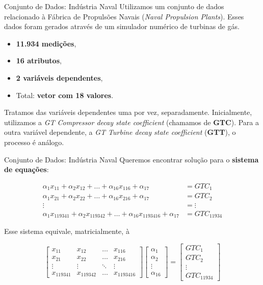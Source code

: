 \documentclass{beamer}
\theoremstyle{definition}
\begin{document}
\begin{frame}{Conjunto de Dados: Indústria Naval}
\justifying
Utilizamos um conjunto de dados relacionado à Fábrica de Propulsões Navais (\textit{Naval Propulsion Plants}). Esses dados foram gerados através de um simulador numérico de turbinas de gás.

\begin{itemize}
    \item \textbf{11.934 medições},
    \item \textbf{16 atributos},
    \item \textbf{2 variáveis dependentes},
    \item Total: \textbf{vetor com 18 valores}.
\end{itemize}
\pause
    
 Tratamos das variáveis dependentes uma por vez, separadamente. Inicialmente, utilizamos a \textit{GT Compressor decay state coefficient} (chamamos de \textbf{GTC}). Para a outra variável dependente, a \textit{GT Turbine decay state coefficient} (\textbf{GTT}), o processo é análogo.
   
\end{frame}

\begin{frame}{Conjunto de Dados: Indústria Naval}
\justifying
Queremos encontrar solução para o \textbf{sistema de equações}:
    
\begin{align*}
    \alpha_1 x_{11} + \alpha_2 x_{12} + \ldots + \alpha_{16} x_{116} + \alpha_{17} &= GTC_1\\
    \alpha_1 x_{21} + \alpha_2 x_{22} + \ldots + \alpha_{16} x_{216} + \alpha_{17} &= GTC_2\\
    \vdots &= \vdots\\
    \alpha_1 x_{119341} + \alpha_2 x_{119342} + \ldots + \alpha_{16} x_{1193416} + \alpha_{17} &= GTC_{11934}
\end{align*}
\pause

Esse sistema equivale, matricialmente, à

$$
\begin{bmatrix}
    x_{11} & x_{12} & \dots & x_{116} \\
    x_{21} & x_{22} & \dots & x_{216} \\
    \vdots & \vdots & \ddots & \vdots \\
    x_{119341} & x_{119342} & \dots & x_{1193416}
\end{bmatrix}
\begin{bmatrix}
    \alpha_1 \\
    \alpha_2 \\
    \vdots\\
    \alpha_{16}
\end{bmatrix}
=
\begin{bmatrix}
    GTC_1 \\
    GTC_2 \\
    \vdots\\
    GTC_{11934}
\end{bmatrix}
$$
   
\end{frame}
\end{document}
